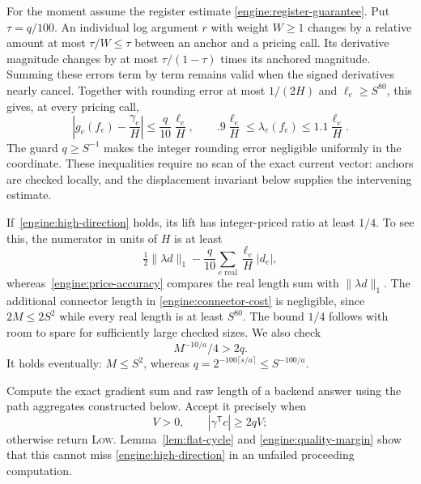 For the moment assume the register estimate
\eqref{engine:register-guarantee}.  Put $\tau=q/100$.  An individual log
argument $r$ with weight $W\ge1$ changes by a relative amount at most
$\tau/W\le\tau$ between an anchor and a pricing call.  Its derivative
magnitude changes by at most $\tau/(1-\tau)$ times its anchored
magnitude.  Summing these errors term by term remains valid when the
signed derivatives nearly cancel.  Together with rounding error at most
$1/(2H)$ and $\ell_e\ge S^{80}$, this gives, at every pricing call,
\begin{equation}\label{engine:price-accuracy}
 \left|g_e(f_e)-\frac{\gamma_e}{H}\right|
       \le\frac q{10}\frac{\ell_e}{H},\qquad
  .9\frac{\ell_e}{H}\le\lambda_e(f_e)
       \le1.1\frac{\ell_e}{H}.
\end{equation}
The guard $q\ge S^{-1}$ makes the integer rounding error negligible
uniformly in the coordinate.  These inequalities require no scan of
the exact current vector: anchors are checked locally, and the
displacement invariant below supplies the intervening estimate.

If~\eqref{engine:high-direction} holds, its lift has integer-priced ratio
at least $1/4$.  To see this, the numerator in units of $H$ is at least
\[
 \tfrac12\|\lambda d\|_1
       -\frac q{10}\sum_{e\text{ real}}\frac{\ell_e}{H}|d_e|,
\]
whereas~\eqref{engine:price-accuracy} compares the real length sum with
$\|\lambda d\|_1$.  The additional connector length in
\eqref{engine:connector-cost} is negligible, since
$2M\le2S^2$ while every real length is at least $S^{80}$.
The bound $1/4$ follows with room to spare for sufficiently large checked
sizes.  We also check
\begin{equation}\label{engine:quality-margin}
                         M^{-10/a}/4>2q.
\end{equation}
It holds eventually: $M\le S^2$, whereas
$q=2^{-100\lceil s/a\rceil}\le S^{-100/a}$.

Compute the exact gradient sum and raw length of a backend answer using
the path aggregates constructed below.  Accept it precisely when
\begin{equation}\label{engine:accept}
                         V>0,\qquad
                  |\gamma^{\mathsf T}c|\ge2qV;
\end{equation}
otherwise return \textsc{Low}.  Lemma~\ref{lem:flat-cycle} and
\eqref{engine:quality-margin} show that this cannot miss
\eqref{engine:high-direction} in an unfailed proceeding computation.

